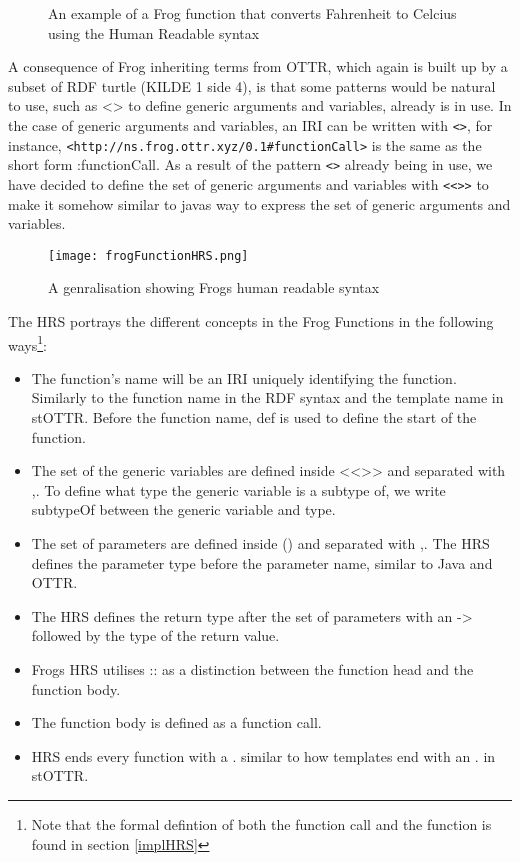 \begin{figure}[h]
    
    \caption{An example of a Frog function that converts Fahrenheit to Celcius using the Human Readable syntax}
    \label{fig:hrs_example}
\end{figure}

\para
A consequence of Frog inheriting terms from OTTR, which again is built up by a subset of RDF turtle (KILDE 1 side 4), is that some patterns would be natural to use, such as <> to define generic arguments and variables, already is in use. In the case of generic arguments and variables, an IRI can be written with \lstinline{<>}, for instance, \lstinline{<http://ns.frog.ottr.xyz/0.1#functionCall>} is the same as the short form :functionCall. As a result of the pattern \lstinline{<>} already being in use, we have decided to define the set of generic arguments and variables with \lstinline{<<>>} to make it somehow similar to javas way to express the set of generic arguments and variables.

\begin{figure}
    \centering
    \texttt{[image: frogFunctionHRS.png]}
    \caption{A genralisation showing Frogs human readable syntax }
    \label{fig:frogFunctionHRS}
\end{figure}

\para 
The HRS portrays the different concepts in the Frog Functions in the following ways\footnote{Note that the formal defintion of both the function call and the function is found in section \ref{implHRS}}:
\begin{itemize}
    \item The function's name will be an IRI uniquely identifying the function. Similarly to the function name in the RDF syntax and the template name in stOTTR. Before the function name, def is used to define the start of the function. 
    \item The set of the generic variables are defined inside <<>> and separated with ,. To define what type the generic variable is a subtype of, we write subtypeOf between the generic variable and type.
    \item The set of parameters are defined inside () and separated with ,.  The HRS defines the parameter type before the parameter name, similar to Java and OTTR.
    \item The HRS defines the return type after the set of parameters with an -> followed by the type of the return value.
    \item Frogs HRS utilises :: as a distinction between the function head and the function body.
    \item The function body is defined as a function call.
    \item HRS ends every function with a . similar to how templates end with an . in stOTTR.   
\end{itemize}


